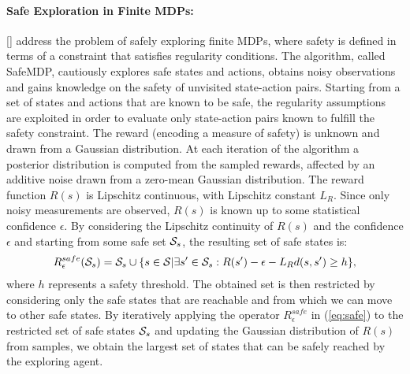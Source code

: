 \paragraph{Safe Exploration in Finite MDPs:} \label{subsec:fmdp}
[\cite{turchetta2016}] address the problem of safely exploring finite \ac{MDPs}, where safety is defined in terms of a constraint that satisfies regularity conditions. The algorithm, called SafeMDP, cautiously explores safe states and actions, obtains noisy observations and gains knowledge on the safety of unvisited state-action pairs.
Starting from a set of states and actions that are known to be safe, the regularity assumptions are exploited in order to evaluate only state-action pairs known to fulfill the safety constraint.
The reward (encoding a measure of safety) is unknown and drawn from a Gaussian distribution. At each iteration of the algorithm a posterior distribution is computed from the sampled rewards, affected by an additive noise drawn from a zero-mean Gaussian distribution. The reward function $R(s)$ is Lipschitz continuous, with Lipschitz constant $L_{R}$. Since only noisy measurements are observed, $R(s)$ is known up to some statistical confidence $\epsilon$. By considering the Lipschitz continuity of $R(s)$ and the confidence $\epsilon$ and starting from some safe set $\mathcal{S}_s$, the resulting set of safe states is:
\begin{align}
R_{\epsilon}^{safe}(\mathcal{S}_s) = \mathcal{S}_s \cup \{s \in \mathcal{S} | \exists s' \in \mathcal{S}_s: R(s') - \epsilon - L_{R} d(s, s') \geq h\}, \label{eq:safe}
\end{align}
where $h$ represents a safety threshold. The obtained set is then restricted by considering only the safe states that are reachable and from which we can move to other safe states.
By iteratively applying the operator $R_{\epsilon}^{safe}$ in (\ref{eq:safe}) to the restricted set of safe states $\mathcal{S}_s$ and updating the Gaussian distribution of $R(s)$ from samples, we obtain the largest set of states that can be safely reached by the exploring agent.

